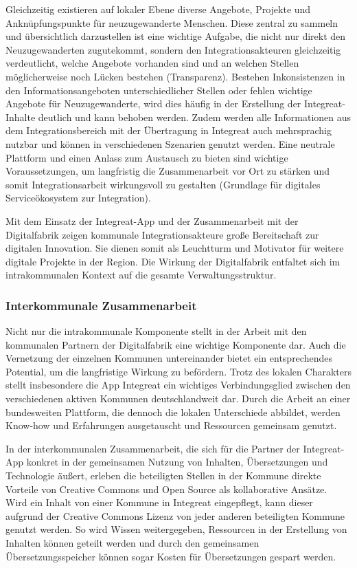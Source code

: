 \documentclass[12pt, a4paper]{article} %
\begin{document}
Gleichzeitig existieren auf lokaler Ebene diverse Angebote, Projekte und
Anknüpfungspunkte für neuzugewanderte Menschen. Diese zentral zu sammeln
und übersichtlich darzustellen ist eine wichtige Aufgabe, die nicht nur
direkt den Neuzugewanderten zugutekommt, sondern den
Integrationsakteuren gleichzeitig verdeutlicht, welche Angebote
vorhanden sind und an welchen Stellen möglicherweise noch Lücken
bestehen (Transparenz). Bestehen Inkonsistenzen in den
Informationsangeboten unterschiedlicher Stellen oder fehlen wichtige
Angebote für Neuzugewanderte, wird dies häufig in der Erstellung der
Integreat-Inhalte deutlich und kann behoben werden. Zudem werden alle
Informationen aus dem Integrationsbereich mit der Übertragung in
Integreat auch mehrsprachig nutzbar und können in verschiedenen
Szenarien genutzt werden. Eine neutrale Plattform und einen Anlass zum
Austausch zu bieten sind wichtige Voraussetzungen, um langfristig die
Zusammenarbeit vor Ort zu stärken und somit Integrationsarbeit
wirkungsvoll zu gestalten (Grundlage für digitales Serviceökosystem zur
Integration).

Mit dem Einsatz der Integreat-App und der Zusammenarbeit mit der
Digitalfabrik zeigen kommunale Integrationsakteure große Bereitschaft
zur digitalen Innovation. Sie dienen somit als Leuchtturm und Motivator
für weitere digitale Projekte in der Region. Die Wirkung der
Digitalfabrik entfaltet sich im intrakommunalen Kontext auf die gesamte
Verwaltungsstruktur.

\hypertarget{interkommunale-zusammenarbeit}{%
\subsubsection{Interkommunale
Zusammenarbeit}\label{interkommunale-zusammenarbeit}}

Nicht nur die intrakommunale Komponente stellt in der Arbeit mit den
kommunalen Partnern der Digitalfabrik eine wichtige Komponente dar. Auch
die Vernetzung der einzelnen Kommunen untereinander bietet ein
entsprechendes Potential, um die langfristige Wirkung zu befördern.
Trotz des lokalen Charakters stellt insbesondere die App Integreat ein
wichtiges Verbindungsglied zwischen den verschiedenen aktiven Kommunen
deutschlandweit dar. Durch die Arbeit an einer bundesweiten Plattform,
die dennoch die lokalen Unterschiede abbildet, werden Know-how und
Erfahrungen ausgetauscht und Ressourcen gemeinsam genutzt.

In der interkommunalen Zusammenarbeit, die sich für die Partner der
Integreat-App konkret in der gemeinsamen Nutzung von Inhalten,
Übersetzungen und Technologie äußert, erleben die beteiligten Stellen in
der Kommune direkte Vorteile von Creative Commons und Open Source als
kollaborative Ansätze. Wird ein Inhalt von einer Kommune in Integreat
eingepflegt, kann dieser aufgrund der Creative Commons Lizenz von jeder
anderen beteiligten Kommune genutzt werden. So wird Wissen
weitergegeben, Ressourcen in der Erstellung von Inhalten können geteilt
werden und durch den gemeinsamen Übersetzungsspeicher können sogar
Kosten für Übersetzungen gespart werden.
\end{document}
